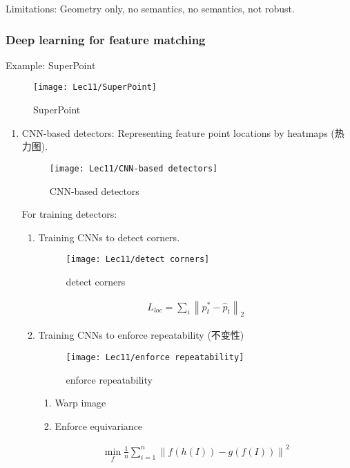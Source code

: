 Limitations: Geometry only, no semantics, no semantics, not robust. 

\subsubsection{Deep learning for feature matching}

Example: SuperPoint

\begin{figure}[H]
    \centering
    \texttt{[image: Lec11/SuperPoint]}
    \caption{SuperPoint}
\end{figure}

\begin{enumerate}
    \item CNN-based detectors: Representing feature point locations by heatmaps (热力图).
    
    \begin{figure}[H]
        \centering
        \texttt{[image: Lec11/CNN-based detectors]}
        \caption{CNN-based detectors}
    \end{figure}

    For training detectors:
    \begin{enumerate}
        \item  Training CNNs to detect corners. 

        \begin{figure}[H]
            \centering
            \texttt{[image: Lec11/detect corners]}
            \caption{detect corners}
        \end{figure}
        \begin{align*}
            L_{loc}=\sum_i \left\| p_t^*-\hat{p}_t \right\|_2
        \end{align*}
        \item Training CNNs to enforce repeatability (不变性)
        
        \begin{figure}[H]
            \centering
            \texttt{[image: Lec11/enforce repeatability]}
            \caption{enforce repeatability}
        \end{figure}

        \begin{enumerate}
            \item Warp image
            \item Enforce equivariance
        \end{enumerate}
        \begin{align*}
            \min_f \frac{1}{n} \sum_{i=1}^n \left\| f(h(I))-g(f(I)) \right\|^2
        \end{align*}
    \end{enumerate}
    

\end{enumerate}
